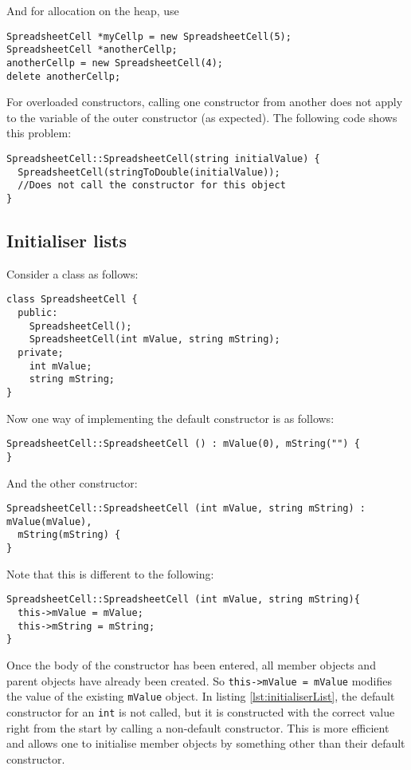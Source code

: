\documentclass[a4paper,12pt,oneside]{book}
\begin{document}
And for allocation on the heap, use
\begin{lstlisting}
SpreadsheetCell *myCellp = new SpreadsheetCell(5);
SpreadsheetCell *anotherCellp;
anotherCellp = new SpreadsheetCell(4);
delete anotherCellp;
\end{lstlisting}

For overloaded constructors, calling one constructor from another does not apply to the variable of the outer constructor (as expected). The following code shows this problem:

\begin{lstlisting}
SpreadsheetCell::SpreadsheetCell(string initialValue) {
  SpreadsheetCell(stringToDouble(initialValue));
  //Does not call the constructor for this object
}
\end{lstlisting}

\subsection{Initialiser lists}
Consider a class as follows:
\begin{lstlisting}
class SpreadsheetCell {
  public:
    SpreadsheetCell();
    SpreadsheetCell(int mValue, string mString);
  private;
    int mValue;
    string mString;
}
\end{lstlisting}

Now one way of implementing the default constructor is as follows:
\begin{lstlisting}
SpreadsheetCell::SpreadsheetCell () : mValue(0), mString("") {
}
\end{lstlisting}

And the other constructor:

\begin{lstlisting}[caption={C++ gets it right with the name clash}, label={lst:initialiserList}]
SpreadsheetCell::SpreadsheetCell (int mValue, string mString) : mValue(mValue),
  mString(mString) {
}
\end{lstlisting}

Note that this is different to the following:

\begin{lstlisting}
SpreadsheetCell::SpreadsheetCell (int mValue, string mString){
  this->mValue = mValue;
  this->mString = mString;
}
\end{lstlisting}

Once the body of the constructor has been entered, all member objects and parent objects have already been created. So \lstinline|this->mValue = mValue| modifies the value of the existing \lstinline|mValue| object. In listing \ref{lst:initialiserList}, the default constructor for an \lstinline|int| is not called, but it is constructed with the correct value right from the start by calling a non-default constructor. This is more efficient and allows one to initialise member objects by something other than their default constructor.
\end{document}
